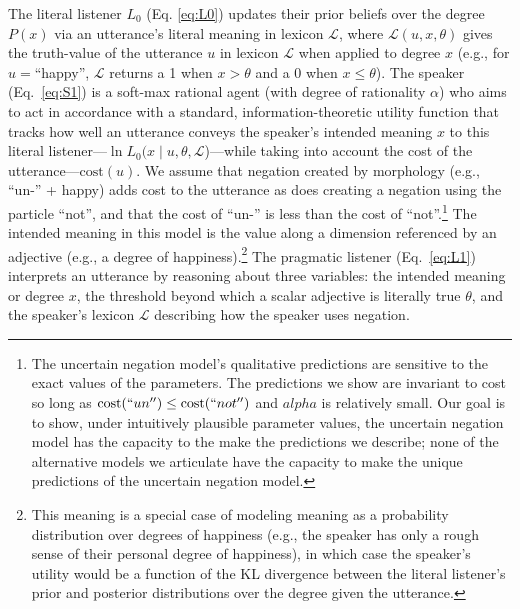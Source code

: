 \documentclass[floatsintext,doc]{apa6}
\let\rmarkdownfootnote\footnote%
\def\footnote{\protect\rmarkdownfootnote}
\begin{document}
The literal listener \(L_0\) (Eq. \ref{eq:L0}) updates their prior beliefs over the degree \(P(x)\) via an utterance's literal meaning in lexicon \(\mathcal{L}\),
where \(\mathcal{L}(u, x, \theta)\) gives the truth-value of the utterance \(u\) in lexicon \(\mathcal{L}\) when applied to degree \(x\) (e.g., for $u= $\enquote{happy}, $\mathcal{L}$ returns a 1 when $x>\theta$ and a 0 when  $x\leq\theta$).
The speaker (Eq.~\ref{eq:S1}) is a soft-max rational agent (with degree of rationality  $\alpha$) who aims to act in accordance with a standard, information-theoretic utility function that tracks how well an utterance conveys the speaker's intended meaning $x$ to this literal listener---$\ln {L_{0}(x \mid u, \theta, \mathcal{L}}$)---while taking into account the cost of the utterance---$\text{cost}(u)$.
We assume that negation created by morphology (e.g., ``un-'' + happy) adds cost to the utterance as does creating a negation using the particle ``not'', and that the cost of ``un-'' is less than the cost of ``not''.\footnote{The uncertain negation model's qualitative predictions are sensitive to the exact values of the parameters. The predictions we show are invariant to cost so long as $\text{cost}(``un'') \leq \text{cost}(``not'')$ and $alpha$ is relatively small. Our goal is to show, under intuitively plausible parameter values, the uncertain negation model has the capacity to the make the predictions we describe; none of the alternative models we articulate have the capacity to make the unique predictions of the uncertain negation model.}
The intended meaning in this model is the value along a dimension referenced by an adjective (e.g., a degree of happiness).\footnote{
	This meaning is a special case of modeling meaning as a probability distribution over degrees of happiness (e.g., the speaker has only a rough sense of their personal degree of happiness), in which case the speaker's utility would be a function of the KL divergence between the literal listener's prior and posterior distributions over the degree given the utterance. 
}
The pragmatic listener (Eq.~\ref{eq:L1}) interprets an utterance by reasoning about three variables: the intended meaning or degree $x$, the threshold beyond which a scalar adjective is literally true  $\theta$, and the speaker's lexicon \(\mathcal{L}\) describing how the speaker uses negation. 
\end{document}
